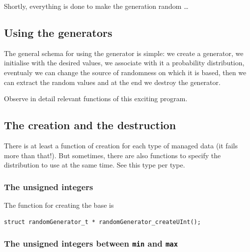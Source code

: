    Shortly, everything is done to make the generation random \ldots


%
\subsection{Using the generators}

  The general schema for using the generator is simple: we create a generator,
we initialise with the desired values, we associate with it a probability 
distribution, eventualy we can change the source of randomness on which it is based,
then we can extract the random values and at the end we destroy the generator.

   Observe in detail relevant functions of this exciting program.

%
\subsection{The creation and the destruction}
   
   There is at least a function of creation for each type of
managed data (it fails more than that!). But sometimes, there are also
functions to specify the distribution to use at the same time. 
See this type per type.

%
\subsubsection{The unsigned integers}

   The function for creating the base is 

\begin{verbatim}
struct randomGenerator_t * randomGenerator_createUInt();
\end{verbatim}

%
\subsubsection{The unsigned integers between {\tt min} and {\tt max}}


